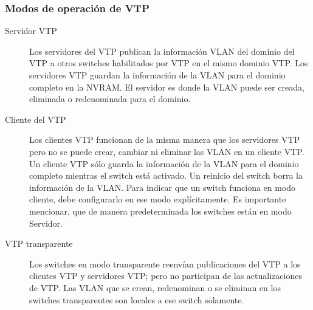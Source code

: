 \documentclass[12pt]{article}
\begin{document}
\subsubsection{Modos de operación de VTP}
 \begin{description}
 \item[Servidor VTP] Los servidores del VTP publican la información VLAN del dominio del VTP a otros switches habilitados por VTP en el mismo dominio VTP. Los servidores VTP guardan la información de la VLAN para el dominio completo en la NVRAM. El servidor es donde la VLAN puede ser creada, eliminada o redenominada para el dominio.
 \item[Cliente del VTP] Los clientes VTP funcionan de la misma manera que los servidores VTP pero no se puede crear, cambiar ni eliminar las VLAN en un cliente VTP. Un cliente VTP sólo guarda la información de la VLAN para el dominio completo mientras el switch está activado. Un reinicio del switch borra la información de la VLAN. Para indicar que un switch funciona en modo cliente, debe configurarlo en ese modo explícitamente. Es importante mencionar, que de manera predeterminada los switches están en modo Servidor.
 \item[VTP transparente] Los switches en modo transparente reenvían publicaciones del VTP a los clientes VTP y servidores VTP; pero no participan de las actualizaciones de VTP. Las VLAN que se crean, redenominan o se eliminan en los switches transparentes son locales a ese switch solamente.
 \end{description}




\end{document}
